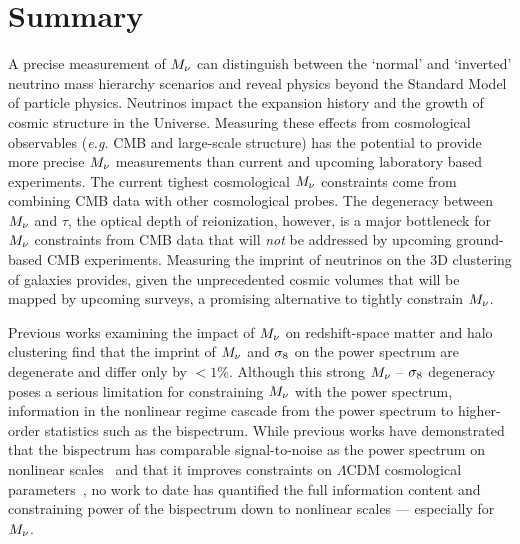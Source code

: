 \section{Summary} 
A precise measurement of $M_\nu$ can distinguish between the `normal' 
and `inverted' neutrino mass hierarchy scenarios and reveal physics 
beyond the Standard Model of particle physics. Neutrinos impact the  
expansion history and the growth of cosmic structure in the Universe. 
Measuring these effects from cosmological observables (\emph{e.g.} 
CMB and large-scale structure) has the potential to provide more precise 
$M_\nu$ measurements than current and upcoming laboratory based experiments. 
The current tighest cosmological $M_\nu$ constraints come from combining 
CMB data with other cosmological probes. The degeneracy between $M_\nu$ 
and $\tau$, the optical depth of reionization, however, is a major bottleneck 
for $M_\nu$ constraints from CMB data that will {\em not} be addressed 
by upcoming ground-based CMB experiments. Measuring the imprint of neutrinos
on the 3D clustering of galaxies provides, given the unprecedented cosmic 
volumes that will be mapped by upcoming surveys, a promising alternative 
to tightly constrain $M_\nu$. 

Previous works examining the impact of $M_\nu$ on redshift-space matter
and halo clustering find that the imprint of $M_\nu$ and $\sigma_8$ on the power 
spectrum are degenerate and differ only by $< 1\%$.
Although this strong $M_\nu$ -- $\sigma_8$ degeneracy poses a serious limitation 
for constraining $M_\nu$ with the power spectrum, information in the nonlinear 
regime cascade from the power spectrum to higher-order statistics such as the 
bispectrum. While previous works have demonstrated that the bispectrum
has comparable signal-to-noise as the power spectrum on nonlinear scales~\citep{sefusatti2005, chan2017}
and that it improves constraints on $\Lambda$CDM cosmological parameters~\citep{sefusatti2006, yankelevich2019}, 
no work to date has quantified the full information content and constraining 
power of the bispectrum down to nonlinear scales --- especially for $M_\nu$. 

